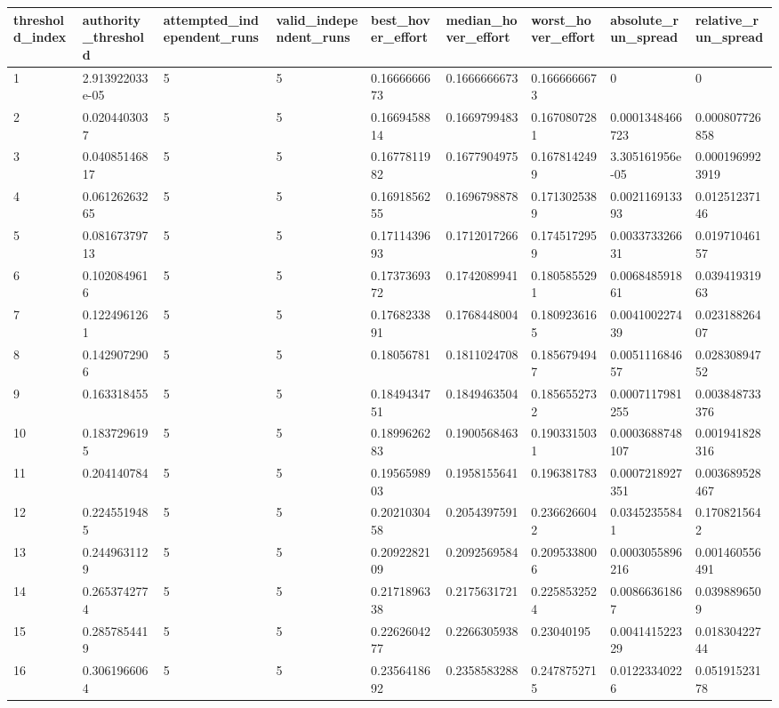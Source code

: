 \begin{tabular}{@{}lllllllll@{}}
\toprule
threshold\_index & authority\_threshold & attempted\_independent\_runs & valid\_independent\_runs & best\_hover\_effort & median\_hover\_effort & worst\_hover\_effort & absolute\_run\_spread & relative\_run\_spread \\
\midrule
1 & 2.913922033e-05 & 5 & 5 & 0.1666666673 & 0.1666666673 & 0.1666666673 & 0 & 0 \\
2 & 0.0204403037 & 5 & 5 & 0.1669458814 & 0.1669799483 & 0.1670807281 & 0.0001348466723 & 0.000807726858 \\
3 & 0.04085146817 & 5 & 5 & 0.1677811982 & 0.1677904975 & 0.1678142499 & 3.305161956e-05 & 0.0001969923919 \\
4 & 0.06126263265 & 5 & 5 & 0.1691856255 & 0.1696798878 & 0.1713025389 & 0.002116913393 & 0.01251237146 \\
5 & 0.08167379713 & 5 & 5 & 0.1711439693 & 0.1712017266 & 0.1745172959 & 0.003373326631 & 0.01971046157 \\
6 & 0.1020849616 & 5 & 5 & 0.1737369372 & 0.1742089941 & 0.1805855291 & 0.006848591861 & 0.03941931963 \\
7 & 0.1224961261 & 5 & 5 & 0.1768233891 & 0.1768448004 & 0.1809236165 & 0.004100227439 & 0.02318826407 \\
8 & 0.1429072906 & 5 & 5 & 0.18056781 & 0.1811024708 & 0.1856794947 & 0.005111684657 & 0.02830894752 \\
9 & 0.163318455 & 5 & 5 & 0.1849434751 & 0.1849463504 & 0.1856552732 & 0.0007117981255 & 0.003848733376 \\
10 & 0.1837296195 & 5 & 5 & 0.1899626283 & 0.1900568463 & 0.1903315031 & 0.0003688748107 & 0.001941828316 \\
11 & 0.204140784 & 5 & 5 & 0.1956598903 & 0.1958155641 & 0.196381783 & 0.0007218927351 & 0.003689528467 \\
12 & 0.2245519485 & 5 & 5 & 0.2021030458 & 0.2054397591 & 0.2366266042 & 0.03452355841 & 0.1708215642 \\
13 & 0.2449631129 & 5 & 5 & 0.2092282109 & 0.2092569584 & 0.2095338006 & 0.0003055896216 & 0.001460556491 \\
14 & 0.2653742774 & 5 & 5 & 0.2171896338 & 0.2175631721 & 0.2258532524 & 0.00866361867 & 0.0398896509 \\
15 & 0.2857854419 & 5 & 5 & 0.2262604277 & 0.2266305938 & 0.23040195 & 0.004141522329 & 0.01830422744 \\
16 & 0.3061966064 & 5 & 5 & 0.2356418692 & 0.2358583288 & 0.2478752715 & 0.01223340226 & 0.05191523178 \\

\end{tabular}
